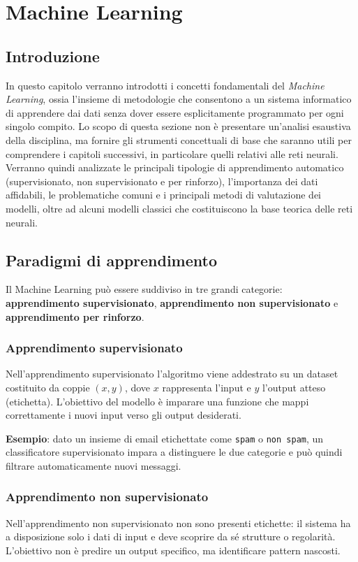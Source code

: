 \chapter{Machine Learning}

\section{Introduzione}
In questo capitolo verranno introdotti i concetti fondamentali del \textit{Machine Learning}, ossia l’insieme di metodologie che consentono a un sistema informatico di apprendere dai dati senza dover essere esplicitamente programmato per ogni singolo compito. 
Lo scopo di questa sezione non è presentare un’analisi esaustiva della disciplina, ma fornire gli strumenti concettuali di base che saranno utili per comprendere i capitoli successivi, in particolare quelli relativi alle reti neurali. 
Verranno quindi analizzate le principali tipologie di apprendimento automatico (supervisionato, non supervisionato e per rinforzo), l’importanza dei dati affidabili, le problematiche comuni e i principali metodi di valutazione dei modelli, oltre ad alcuni modelli classici che costituiscono la base teorica delle reti neurali.

\section{Paradigmi di apprendimento}
Il Machine Learning può essere suddiviso in tre grandi categorie: \textbf{apprendimento supervisionato}, \textbf{apprendimento non supervisionato} e \textbf{apprendimento per rinforzo}. 


\subsection{Apprendimento supervisionato}
Nell’apprendimento supervisionato l’algoritmo viene addestrato su un dataset costituito da coppie \((x, y)\), dove \(x\) rappresenta l’input e \(y\) l’output atteso (etichetta). 
L’obiettivo del modello è imparare una funzione che mappi correttamente i nuovi input verso gli output desiderati.

\textbf{Esempio}: dato un insieme di email etichettate come \texttt{spam} o \texttt{non spam}, un classificatore supervisionato impara a distinguere le due categorie e può quindi filtrare automaticamente nuovi messaggi.


\subsection{Apprendimento non supervisionato}
Nell’apprendimento non supervisionato non sono presenti etichette: il sistema ha a disposizione solo i dati di input e deve scoprire da sé strutture o regolarità. 
L’obiettivo non è predire un output specifico, ma identificare pattern nascosti.

